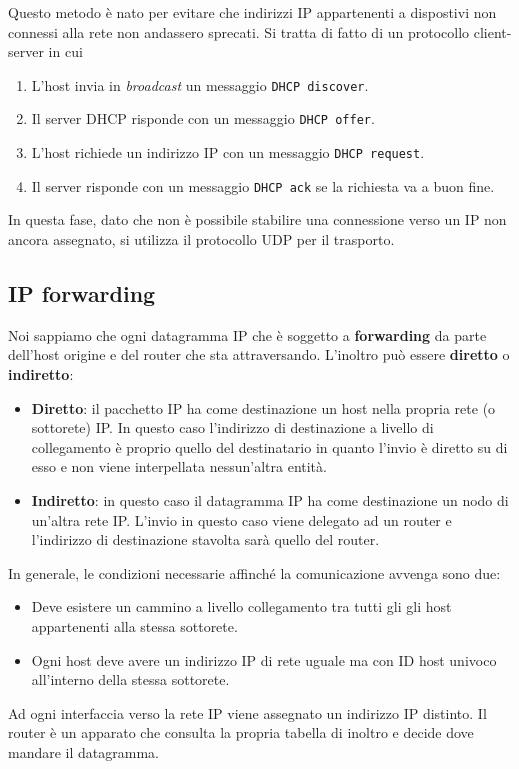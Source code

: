 Questo metodo è nato per evitare che indirizzi IP appartenenti a 
dispostivi non connessi alla rete non andassero sprecati. Si tratta 
di fatto di un protocollo client-server in cui
\begin{enumerate}
	\item L'host invia in \emph{broadcast} un messaggio 
		\verb|DHCP discover|.
	\item Il server DHCP risponde con un messaggio \verb|DHCP offer|.
	\item L'host richiede un indirizzo IP con un messaggio 
		\verb|DHCP request|.
	\item Il server risponde con un messaggio \verb|DHCP ack| se la 
		richiesta va a buon fine.
\end{enumerate}
In questa fase, dato che non è possibile stabilire una connessione 
verso un IP non ancora assegnato, si utilizza il protocollo UDP per 
il trasporto.

\subsection{IP forwarding}
Noi sappiamo che ogni datagramma IP che è soggetto a
\textbf{forwarding} da parte dell'host origine e del router che sta
attraversando. L'inoltro può essere \textbf{diretto} o 
\textbf{indiretto}:
\begin{itemize}
	\item \textbf{Diretto}: il pacchetto IP ha come destinazione un
		host nella propria rete (o sottorete) IP. In questo caso 
		l'indirizzo di destinazione a livello di collegamento è proprio
		quello del destinatario in quanto l'invio è diretto su di esso
		e non viene interpellata nessun'altra entità.
	\item \textbf{Indiretto}: in questo caso il datagramma IP ha come 
		destinazione un nodo di un'altra rete IP. L'invio in questo
		caso viene delegato ad un router e l'indirizzo di destinazione
		stavolta sarà quello del router.
\end{itemize}
In generale, le condizioni necessarie affinché la comunicazione avvenga
sono due:
\begin{itemize}
	\item Deve esistere un cammino a livello collegamento tra tutti gli
		gli host appartenenti alla stessa sottorete.
	\item Ogni host deve avere un indirizzo IP di rete uguale ma con
		ID host univoco all'interno della stessa sottorete.
\end{itemize}
Ad ogni interfaccia verso la rete IP viene assegnato un indirizzo IP 
distinto. Il router è un apparato che consulta la propria tabella di
inoltro e decide dove mandare il datagramma.

